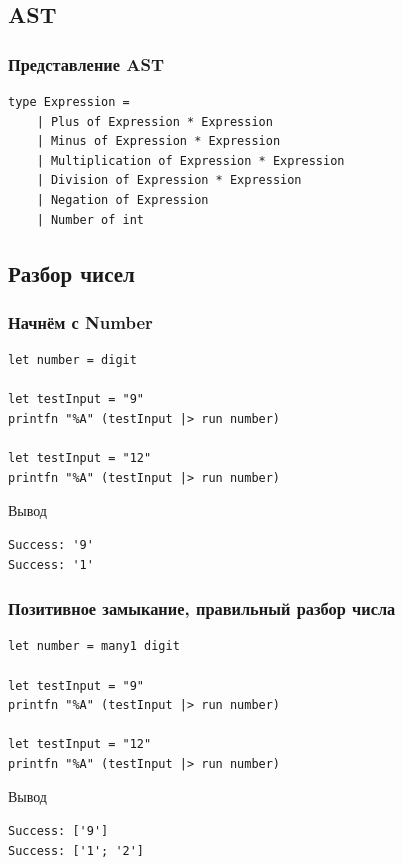 \documentclass{../../slides-style}
\begin{document}
    \subsection{AST}

    \begin{frame}[fragile]
        \frametitle{Представление AST}
        \begin{verbatim}
type Expression =
    | Plus of Expression * Expression
    | Minus of Expression * Expression
    | Multiplication of Expression * Expression
    | Division of Expression * Expression
    | Negation of Expression
    | Number of int
        \end{verbatim}
    \end{frame}

    \subsection{Разбор чисел}

    \begin{frame}[fragile]
        \frametitle{Начнём с Number}
        \begin{verbatim}
let number = digit

let testInput = "9"
printfn "%A" (testInput |> run number)

let testInput = "12"
printfn "%A" (testInput |> run number)
        \end{verbatim}

        \begin{exampleblock}{Вывод}
            \begin{verbatim}
Success: '9'
Success: '1'
            \end{verbatim}
        \end{exampleblock}
    \end{frame}

    \begin{frame}[fragile]
        \frametitle{Позитивное замыкание, правильный разбор числа}
        \begin{verbatim}
let number = many1 digit

let testInput = "9"
printfn "%A" (testInput |> run number)

let testInput = "12"
printfn "%A" (testInput |> run number)
        \end{verbatim}

        \begin{exampleblock}{Вывод}
            \begin{verbatim}
Success: ['9']
Success: ['1'; '2']
            \end{verbatim}
        \end{exampleblock}
    \end{frame}
\end{document}

